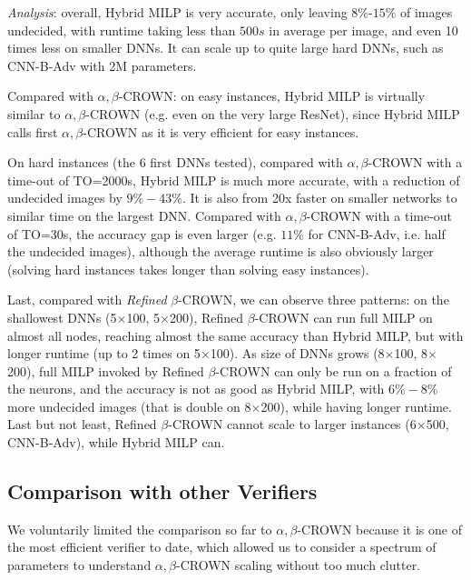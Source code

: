 {\em Analysis}: overall, Hybrid MILP is very accurate, only leaving $8\%$-$15\%$ of images undecided, with runtime taking less than $500s$ in average per image, and even 10 times less on smaller DNNs. It can scale up to quite large hard DNNs, such as CNN-B-Adv with 2M parameters.

Compared with $\alpha,\beta$-CROWN: on easy instances, Hybrid MILP is virtually similar to $\alpha,\beta$-CROWN (e.g. even on the very large ResNet), since Hybrid MILP calls first $\alpha,\beta$-CROWN as it is very efficient for easy instances.

On hard instances (the 6 first DNNs tested), compared with $\alpha,\beta$-CROWN with a time-out of TO=2000s, Hybrid MILP is much more accurate, with a reduction of undecided images by $9\%-43\%$. It is also from 20x faster on smaller networks to similar time on the largest DNN. Compared with $\alpha,\beta$-CROWN with a time-out of TO=30s, the accuracy gap is even larger (e.g. $11\%$ for CNN-B-Adv, i.e. half the undecided images), although the average runtime is also obviously larger (solving hard instances takes longer than solving easy instances).

Last, compared with {\em Refined} $\beta$-CROWN, we can observe three patterns: on the shallowest DNNs (5$\times$100, 5$\times$200), Refined $\beta$-CROWN can run full MILP on almost all nodes, reaching almost the same accuracy than  Hybrid MILP, but with longer runtime (up to 2 times on 5$\times$100). As size of DNNs grows (8$\times$100, 8$\times$200), full MILP invoked by Refined $\beta$-CROWN can only be run on a fraction of the neurons, and the accuracy is not as good as Hybrid MILP, with $6\%-8\%$ more undecided images (that is double on 8$\times$200), while having longer runtime. Last but not least, Refined $\beta$-CROWN cannot scale to larger instances (6$\times$500, CNN-B-Adv), while Hybrid MILP can.





\subsection{Comparison with other Verifiers}

We voluntarily limited the comparison so far to $\alpha,\beta$-CROWN because it is one of the most efficient verifier to date, which allowed us to consider a spectrum of parameters to understand $\alpha,\beta$-CROWN scaling without too much clutter.

